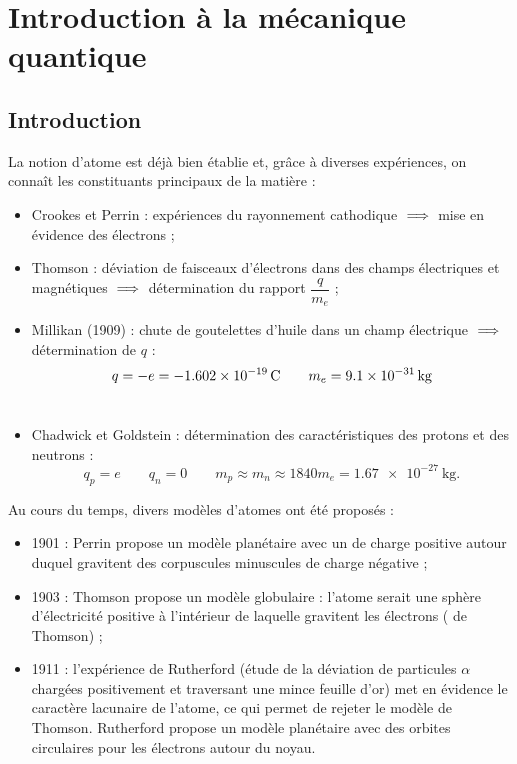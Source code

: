 \chapter{Introduction à la mécanique quantique}

\minitoc

\section*{Introduction}

La notion d'atome est déjà bien établie et, grâce à diverses expériences, on connaît les constituants principaux de la matière :

\begin{itemize}
    \item Crookes et Perrin : expériences du rayonnement cathodique \(\implies\) mise en évidence des électrons ; \\
    \item Thomson : déviation de faisceaux d'électrons dans des champs électriques et magnétiques \(\implies\) détermination du rapport \(\dfrac{q}{m_e}\) ; \\
    \item Millikan (1909) : chute de goutelettes d'huile dans un champ électrique \(\implies\) détermination de \(q\) : \[q=-e=\SI{-1.602e-19}{\C}\qquad m_e=\SI{9.1e-31}{\kilo\gram}\]~
    \item Chadwick et Goldstein : détermination des caractéristiques des protons et des neutrons : \[q_p=e\qquad q_n=0\qquad m_p\approx m_n\approx\num{1840}m_e=\SI{1.67e-27}{\kilo\gram}.\]
\end{itemize}

Au cours du temps, divers modèles d'atomes ont été proposés :

\begin{itemize}
    \item 1901 : Perrin propose un modèle planétaire avec un  de charge positive autour duquel gravitent des corpuscules minuscules de charge négative ; \\
    \item 1903 : Thomson propose un modèle globulaire : l'atome serait une sphère d'électricité positive à l'intérieur de laquelle gravitent les électrons ( de Thomson) ; \\
    \item 1911 : l'expérience de Rutherford (étude de la déviation de particules \(\alpha\) chargées positivement et traversant une mince feuille d'or) met en évidence le caractère lacunaire de l'atome, ce qui permet de rejeter le modèle de Thomson. Rutherford propose un modèle planétaire avec des orbites circulaires pour les électrons autour du noyau.
\end{itemize}

